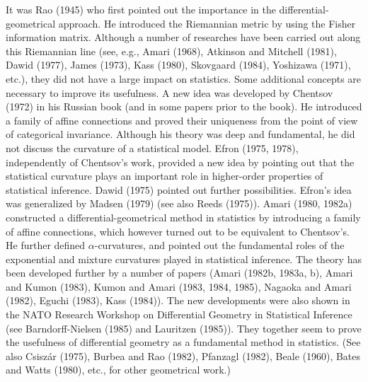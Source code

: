 \documentclass[11pt]{article}
\begin{document}
            It was Rao (1945) who first pointed out the importance in the
differential-geometrical approach.  He introduced the Riemannian metric by using
the Fisher information matrix.  Although a number of researches have been
carried out along this Riemannian line (see, e.g., Amari (1968), Atkinson and
Mitchell (1981), Dawid (1977), James (1973), Kass (1980), Skovgaard (1984),
Yoshizawa (1971), etc.), they did not have a large impact on statistics.  Some
additional concepts are necessary to improve its usefulness.  A new idea was
developed by Chentsov (1972) in his Russian book (and in some papers prior to
the book).  He introduced a family of affine connections and proved their unique{ness}
     from the point of view of categorical invariance.  Although his theory was
deep and fundamental, he did not discuss the curvature of a statistical model.
Efron (1975, 1978), independently of Chentsov's work, provided a new idea by 
pointing out that the statistical curvature plays an important role in higher-order
      properties of statistical inference.  Dawid (1975) pointed out further
possibilities.  Efron's idea was generalized by Madsen (1979) (see also Reeds
(1975)).  Amari (1980, 1982a) constructed a differential-geometrical method in
statistics by introducing a family of affine connections, which however turned
out to be equivalent to Chentsov's.  He further defined $\alpha$-curvatures, and pointed
   out the fundamental roles of the exponential and mixture curvatures played in
statistical inference.  The theory has been developed further by a number of
papers (Amari (1982b, 1983a, b), Amari and Kumon (1983), Kumon and Amari (1983,
1984, 1985), Nagaoka and Amari (1982), Eguchi (1983), Kass (1984)).  The new
developments were also shown in the NATO Research Workshop on Differential Geo{metry}
      in Statistical Inference (see Barndorff-Nielsen (1985) and Lauritzen
(1985)).  They together seem to prove the usefulness of differential geometry as
a fundamental method in statistics.  (See also Csisz\'{a}r (1975), Burbea and Rao
(1982), Pfanzagl (1982), Beale (1960), Bates and Watts (1980), etc., for other
geometrical work.)
\end{document}
